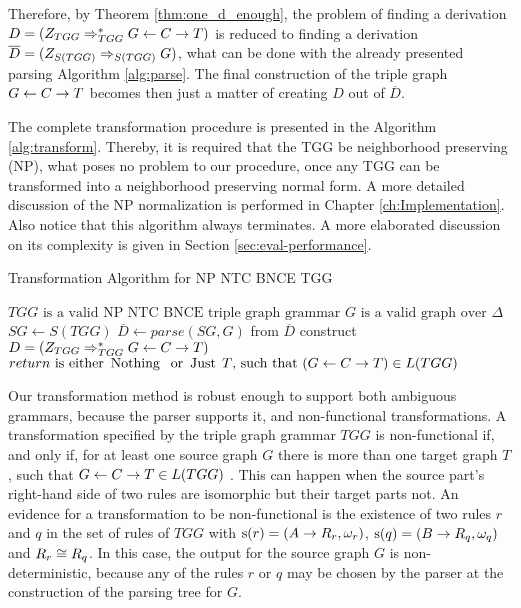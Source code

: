 Therefore, by Theorem \ref{thm:one_d_enough}, the problem of finding a derivation $D = (Z_{TGG} \Rightarrow^*_{TGG} G \overset{}{\leftarrow} C \overset{}{\rightarrow} T)$ is reduced to finding a derivation $\overline{D} = (\startG{S(TGG)} \deriv{}{}{S(TGG)} G)$, what can be done with the already presented parsing Algorithm \ref{alg:parse}. The final construction of the triple graph $G \overset{}{\leftarrow} C \overset{}{\rightarrow} T$ becomes then just a matter of creating $D$ out of $\overline{D}$.

The complete transformation procedure is presented in the Algorithm \ref{alg:transform}. Thereby, it is required that the TGG be neighborhood preserving (NP), what poses no problem to our procedure, once any TGG can be transformed into a neighborhood preserving normal form. A more detailed discussion of the NP normalization is performed in Chapter \ref{ch:Implementation}. Also notice that this algorithm always terminates. A more elaborated discussion on its complexity is given in Section \ref{sec:eval-performance}.

\begin{algorithm}[!h]
	\caption{Transformation Algorithm for NP NTC BNCE TGG}
	\begin{algorithmic}[!ht]
		\Require $TGG \text{ is a valid NP NTC BNCE triple graph grammar}$
		\Require $G \text{ is a valid graph over } \Delta$
		\State $SG \gets S(TGG)$ 
		\State $\overline{D} \gets parse(SG,G)$ 
		 
		\State from $\overline{D}$ construct $D = (Z_{TGG} \Rightarrow^*_{TGG} G \overset{}{\leftarrow} C \overset{}{\rightarrow} T)$
		\State {}
		\Else
		\State \Return {$\Nothing$} 
		\EndIf
		\EndFunction 
		\Ensure $return \text{ is either } \operatorname{\text{Nothing}}\; \text{ or } \operatorname{\text{Just}}\; T \text{, such that } (G \overset{}{\leftarrow} C \overset{}{\rightarrow} T) \in L(TGG)$
	\end{algorithmic}
	\label{alg:transform}
\end{algorithm}

Our transformation method is robust enough to support both ambiguous grammars, because the parser supports it, and non-functional transformations. A transformation specified by the triple graph grammar $TGG$ is non-functional if, and only if, for at least one source graph $G$ there is more than one target graph $T$, such that $G \overset{}{\leftarrow} C \overset{}{\rightarrow} T \in L(TGG)$ \cite{Hermann2010}. This can happen when the source part's right-hand side of two rules are isomorphic but their target parts not. An evidence for a transformation to be non-functional is the existence of two rules $r$ and $q$ in the set of rules of $TGG$ with $\operatorname{s}(r) = (A \to R_r,\omega_r)$, $\operatorname{s}(q) = (B \to R_q,\omega_q)$ and $R_r \cong R_q$. In this case, the output for the source graph $G$ is non-deterministic, because any of the rules $r$ or $q$ may be chosen by the parser at the construction of the parsing tree for $G$.

